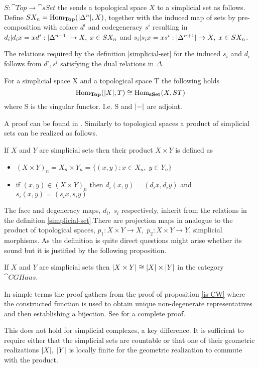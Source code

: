 \documentclass[../../main.tex]{subfiles}
\begin{document}
    \begin{definition}
        $S:\cat{Top}\to \cat{sSet}$ the  sends a topological space $X$ to a simplicial set as follows. Define $SX_n=\Hom_{\cat{Top}}(\geom[\Delta^n],X)$,  together with the induced map of sets by pre-composition with coface $d^i$ and codegeneracy $s^i$ resulting in $d_i|d_ix=xd^i:\geom[\Delta^{n-1}] \to X,\; x \in SX_n$ and $s_i|s_ix=xs^i:\geom[\Delta^{n+1}]\to X,\; x \in SX_n$. 
    \end{definition}
    The relations required by the definition \ref{simplicial-set} for the induced $s_i$ and $d_i$ follows from $d^i,s^i$ satisfying the dual relations in $\Delta$.  
    \begin{proposition}
        For a simplicial space X and a topological space T the following holds
        \[\Hom_{\cat{Top}}(\geom[X],T)\cong \Hom_{\cat{sSet}}(X,ST)\]
        where S is the singular functor. I.e. S and $\geom[-]$ are adjoint. 
    \end{proposition}
    A proof can be found in \cite{simp-may}. 
    Similarly to topological spaces a product of simplicial sets can be realized as follows.

    \begin{definition}
        If $X$ and $Y$ are simplicial sets then their product $X\times Y$ is defined as 
        \begin{itemize}
            \item $(X\times Y)_n= X_n\times Y_n= \{(x,y):x\in X_n,\; y \in Y_n \}$
            \item if $(x,y)\in (X\times Y)_n$ then $d_i(x,y)=(d_ix,d_iy)$ and $s_i(x,y)=(s_ix,s_iy)$
        \end{itemize}
    \end{definition}
    
    The face and degeneracy maps, $d_i,\; s_i$ respectively, inherit from the relations in the definition \ref{simplicial-set}.There are projection maps in analogue to the product of topological spaces, $p_1:X\times Y \to X,\; p_2:X\times Y \to Y$, simplicial morphisms. As the definition is quite direct questions might arise whether its sound but it is justified by the following proposition.

    \begin{proposition}
        If $X$ and $Y$ are simplicial sets then $\geom[X\times Y]\cong \geom[X]\times \geom[Y]$ in the category $\cat{CGHaus}$.
    \end{proposition}

    In simple terms the proof gathers from the proof of proposition \ref{is-CW} where the constructed function is used to obtain unique non-degenerate representatives and then establishing a bijection. See \cite{simp-may} for a complete proof. 

    This does not hold for simplicial complexes, a key difference. It is sufficient to require either that the simplicial sets are countable or that one of their geometric realizations $\geom[X],\; \geom[Y]$ is locally finite for the geometric realization to commute with the product. 
\end{document}

